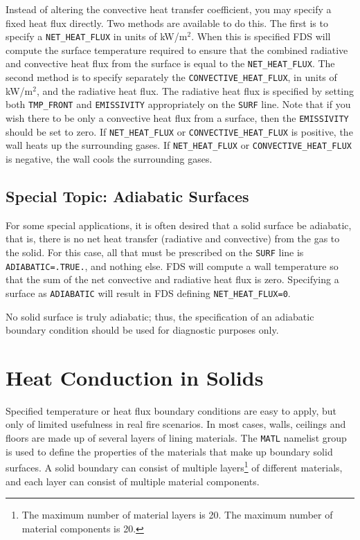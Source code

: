 \documentclass[11pt]{book}
\newcommand{\ct}{\tt\small}
\begin{document}
Instead of altering the convective heat transfer coefficient, you may specify
a fixed heat flux directly.  Two methods are available to do this.  The first is to specify a
{\ct NET\_HEAT\_FLUX} in units of kW/m$^2$.  When this is specified FDS will compute the surface
temperature required to
ensure that the combined radiative and convective heat flux from the surface is equal to the
{\ct NET\_HEAT\_FLUX}.  The second method is to specify separately the {\ct CONVECTIVE\_HEAT\_FLUX},
in units of kW/m$^2$, and the radiative heat flux.  The radiative heat flux is specified  by setting both
{\ct TMP\_FRONT} and {\ct EMISSIVITY} appropriately on the {\ct SURF} line. Note that if you wish there to be only a convective heat flux from a
surface, then the {\ct EMISSIVITY} should be set to zero.  If {\ct NET\_HEAT\_FLUX} or
{\ct CONVECTIVE\_HEAT\_FLUX} is positive, the wall heats up the surrounding gases. If {\ct NET\_HEAT\_FLUX} or
{\ct CONVECTIVE\_HEAT\_FLUX} is negative, the wall cools the surrounding gases.



\subsection{Special Topic: Adiabatic Surfaces}
\label{info:adiabatic}

For some special applications, it is often desired that a solid
surface be adiabatic, that is, there is no net heat transfer
(radiative and convective) from the gas to the solid. For this case,
all that must be prescribed on the {\ct SURF} line is {\ct ADIABATIC=.TRUE.}, and nothing else.  FDS will compute a wall temperature
so that the sum of the net convective and radiative heat flux is zero.  Specifying a surface as {\ct ADIABATIC} will
result in FDS defining {\ct NET\_HEAT\_FLUX=0}.

\begin{warning}
No solid surface is truly adiabatic; thus, the specification of an adiabatic boundary condition should be used for diagnostic purposes only.
\end{warning}



\clearpage


\section{Heat Conduction in Solids}
\label{info:MATL}

Specified temperature or heat flux boundary conditions are
easy to apply, but only of limited usefulness in real fire scenarios.
In most cases, walls, ceilings and floors are made up of several layers
of lining materials. The {\ct MATL} namelist group is used to define the properties of the materials that make
up boundary solid surfaces. A solid boundary can consist of
multiple layers\footnote{The maximum number of material layers is 20. The maximum number of material components is 20.} of different
materials, and each layer can consist of multiple material
components.
\end{document}

